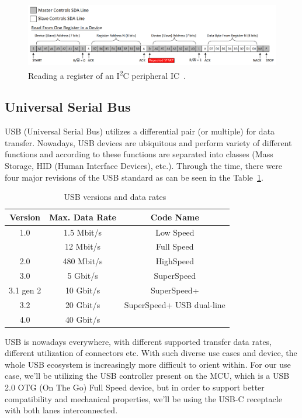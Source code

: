 \begin{figure}[H]
    \centering
    \includegraphics[width=1.1\textwidth]{obrazky/i2c_r}
    \caption{Reading a register of an I\textsuperscript{2}C peripheral IC~\cite{valdez_understanding_2015}.}
    \label{fig:i2c_r}
\end{figure}

\subsection{Universal Serial Bus}
\label{subsec:usb}
USB (Universal Serial Bus) utilizes a differential pair (or multiple) for data transfer.
Nowadays, USB devices are ubiquitous and perform variety of different functions and according to these functions are separated into classes (Mass Storage, HID (Human Interface Devices), etc.).
Through the time, there were four major revisions of the USB standard as can be seen in the Table~\ref{tab:usb}.

\begin{table}[H]
    \centering
    \begin{tabular}{ |c|c|c| }
        \hline
        Version & Max. Data Rate & Code Name \\
        \hline
        \hline
        1.0 & 1.5 Mbit/s & Low Speed \\
        \hline
         & 12 Mbit/s & Full Speed \\
        \hline
        2.0 & 480 Mbit/s & HighSpeed \\
        \hline
        3.0 & 5 Gbit/s & SuperSpeed \\
        \hline
        3.1 gen 2 & 10 Gbit/s & SuperSpeed+ \\
        \hline
        3.2 & 20 Gbit/s & SuperSpeed+ USB dual-line \\
        \hline
        4.0 & 40 Gbit/s &  \\
        \hline
    \end{tabular}
    \caption{USB versions and data rates~\cite{noauthor_usb_2021}}
    \label{tab:usb}
\end{table}

USB is nowadays everywhere, with different supported transfer data rates, different utilization of connectors etc.
With such diverse use cases and device, the whole USB ecosystem is increasingly more difficult to orient within.
For our use case, we'll be utilizing the USB controller present on the MCU, which is a USB 2.0 OTG (On The Go) Full Speed device\cite{stmicro_an4879_2018}, but in order to support better compatibility and mechanical properties, we'll be using the USB-C receptacle with both lanes interconnected.